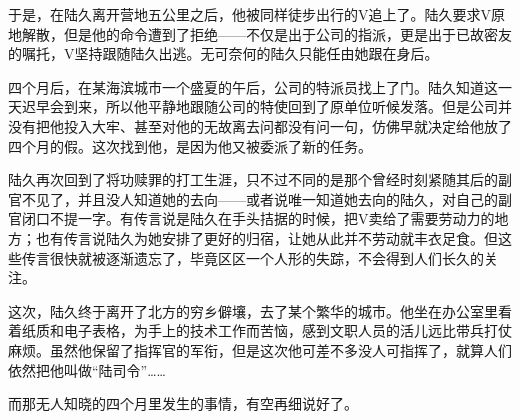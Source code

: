 于是，在陆久离开营地五公里之后，他被同样徒步出行的V追上了。陆久要求V原地解散，但是他的命令遭到了拒绝——不仅是出于公司的指派，更是出于已故密友的嘱托，V坚持跟随陆久出逃。无可奈何的陆久只能任由她跟在身后。

四个月后，在某海滨城市一个盛夏的午后，公司的特派员找上了门。陆久知道这一天迟早会到来，所以他平静地跟随公司的特使回到了原单位听候发落。但是公司并没有把他投入大牢、甚至对他的无故离去问都没有问一句，仿佛早就决定给他放了四个月的假。这次找到他，是因为他又被委派了新的任务。

陆久再次回到了将功赎罪的打工生涯，只不过不同的是那个曾经时刻紧随其后的副官不见了，并且没人知道她的去向——或者说唯一知道她去向的陆久，对自己的副官闭口不提一字。有传言说是陆久在手头拮据的时候，把V卖给了需要劳动力的地方；也有传言说陆久为她安排了更好的归宿，让她从此并不劳动就丰衣足食。但这些传言很快就被逐渐遗忘了，毕竟区区一个人形的失踪，不会得到人们长久的关注。

这次，陆久终于离开了北方的穷乡僻壤，去了某个繁华的城市。他坐在办公室里看着纸质和电子表格，为手上的技术工作而苦恼，感到文职人员的活儿远比带兵打仗麻烦。虽然他保留了指挥官的军衔，但是这次他可差不多没人可指挥了，就算人们依然把他叫做“陆司令”……

而那无人知晓的四个月里发生的事情，有空再细说好了。